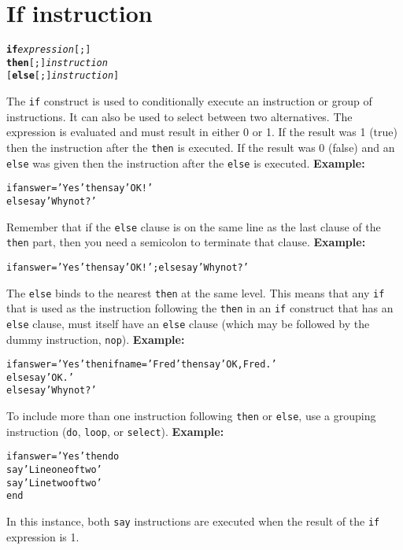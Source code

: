 \chapter{If instruction}
\index{,}
\begin{shaded}
\begin{alltt}
\textbf{if} \emph{expression}[;]
     \textbf{then}[;] \emph{instruction}
    [\textbf{else}[;] \emph{instruction}]
\end{alltt}
\end{shaded}
 The \texttt{if} construct is used to conditionally execute an
instruction or group of instructions.
It can also be used to select between two alternatives.
 The expression is evaluated and must result in either 0 or 1.
If the result was 1 (true) then the instruction after the
\texttt{then} is executed.
If the result was 0 (false) and an \texttt{else} was given
then the instruction after the \texttt{else} is executed.
 \textbf{Example:}
\begin{alltt}
if answer='Yes' then say 'OK!'
                else say 'Why not?'
\end{alltt}
 Remember that if the \texttt{else} clause is on the same line as the
last clause of the \texttt{then} part, then you need a semicolon to
terminate that clause.
 \textbf{Example:}
\begin{alltt}
if answer='Yes' then say 'OK!';  else say 'Why not?'
\end{alltt}
 The \texttt{else} binds to the nearest \texttt{then} at the same level.
This means that any \texttt{if} that is used as the instruction
following the \texttt{then} in an \texttt{if} construct that has an
\texttt{else} clause, must itself have an \texttt{else} clause (which
may be followed by the dummy instruction, \texttt{nop}).
 \textbf{Example:}
\begin{alltt}
if answer='Yes' then if name='Fred' then say 'OK, Fred.'
                                    else say 'OK.'
                else say 'Why not?'
\end{alltt}
 
To include more than one instruction following \texttt{then} or
\texttt{else}, use a grouping instruction (\texttt{do}, \texttt{loop},
or \texttt{select}).
 \textbf{Example:}
\begin{alltt}
if answer='Yes' then do
  say 'Line one of two'
  say 'Line two of two'
  end
\end{alltt}
In this instance, both \texttt{say} instructions are executed when
the result of the \texttt{if} expression is 1.
 
